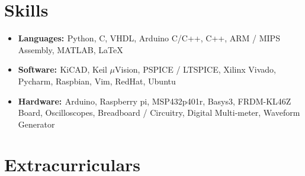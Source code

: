 \documentclass[a4paper]{comcv}
\begin{document}

\smallskip

\section{Skills}
\begin{itemize}
    \item {\bf{Languages: }}  {Python, C, VHDL, Arduino C/C++, C++, ARM / MIPS Assembly, MATLAB, \LaTeX} 
    
    \item {\bf{Software: }} {KiCAD, Keil $\mu$Vision, PSPICE / LTSPICE, Xilinx Vivado, Pycharm, Raspbian, Vim, RedHat, Ubuntu}
    
    \item {\bf{Hardware: }}  {Arduino, Raspberry pi, MSP432p401r,  Basys3,  FRDM-KL46Z Board, Oscilloscopes, Breadboard / Circuitry, Digital Multi-meter, Waveform Generator} 
\end{itemize}
\smallskip

\section{Extracurriculars}
\end{document}
